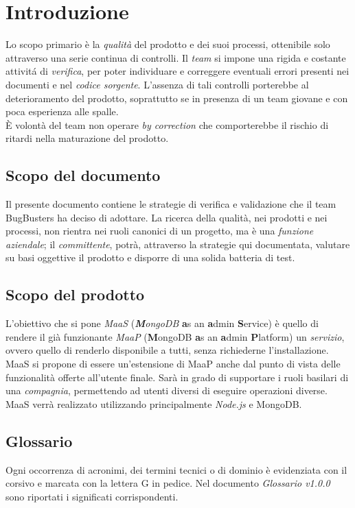 \section{Introduzione}
Lo scopo primario è la \textit{qualit\`a} del prodotto e dei suoi processi, ottenibile solo attraverso una serie continua di controlli. Il \textit{team} si impone una rigida e costante attivit\'a di \textit{verifica}, per poter individuare e correggere eventuali errori presenti nei documenti e nel \textit{codice sorgente}. L'assenza di tali controlli porterebbe al deterioramento del prodotto, soprattutto se in presenza di un team giovane e con poca esperienza alle spalle. \\
\`E volont\`a del team non operare \textit{by correction} che comporterebbe il rischio di ritardi nella maturazione del prodotto.

\subsection{Scopo del documento}
Il presente documento contiene le strategie di verifica e validazione che il team BugBusters ha deciso di adottare. La ricerca della qualit\`a, nei prodotti e nei processi, non rientra nei ruoli canonici di un progetto, ma \`e una \textit{funzione aziendale}; il \textit{committente}, potrà, attraverso la strategie qui documentata, valutare su basi oggettive il prodotto e disporre di una solida batteria di test.

\subsection{Scopo del prodotto}
L'obiettivo che si pone \textit{MaaS} (\textit{\textbf{M}ongoDB} \textbf{a}s an \textbf{a}dmin \textbf{S}ervice) \`e quello di rendere il gi\`a funzionante \textit{MaaP} (\textbf{M}ongoDB \textbf{a}s an \textbf{a}dmin \textbf{P}latform) un \textit{servizio}, ovvero quello di renderlo disponibile a tutti, senza richiederne l'installazione. MaaS si propone di essere un'estensione di MaaP anche dal punto di vista delle funzionalit\`a offerte all'utente finale. Sar\`a in grado di supportare i ruoli basilari di una \textit{compagnia}, permettendo ad utenti diversi di eseguire operazioni diverse. \\
MaaS verr\`a realizzato utilizzando principalmente \textit{Node.js} e MongoDB.

\subsection{Glossario}
Ogni occorrenza di acronimi, dei termini tecnici o di dominio \`e evidenziata con il corsivo e marcata con la lettera G in pedice. Nel documento \textit{Glossario v1.0.0} sono riportati i significati corrispondenti.


